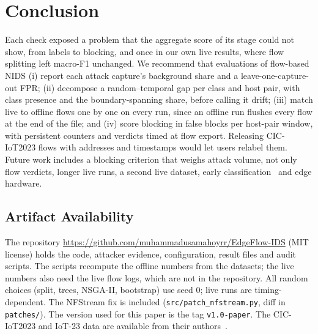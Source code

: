 \section{Conclusion}\label{sec:conclusion}

Each check exposed a problem that the aggregate score of its stage could not show, from labels to blocking, and once in our own live results, where flow splitting left macro-F1 unchanged. We recommend that evaluations of flow-based NIDS (i) report each attack capture's background share and a leave-one-capture-out FPR; (ii) decompose a random--temporal gap per class and host pair, with class presence and the boundary-spanning share, before calling it drift; (iii) match live to offline flows one by one on every run, since an offline run flushes every flow at the end of the file; and (iv) score blocking in false blocks per host-pair window, with persistent counters and verdicts timed at flow export. Releasing CIC-IoT2023 flows with addresses and timestamps would let users relabel them. Future work includes a blocking criterion that weighs attack volume, not only flow verdicts, longer live runs, a second live dataset, early classification~\cite{pekar2025early} and edge hardware.

\subsection{Artifact Availability}

The repository \url{https://github.com/muhammadusamahoyrr/EdgeFlow-IDS} (MIT license) holds the code, attacker evidence, configuration, result files and audit scripts. The scripts recompute the offline numbers from the datasets; the live numbers also need the live flow logs, which are not in the repository. All random choices (split, trees, NSGA-II, bootstrap) use seed 0; live runs are timing-dependent. The NFStream fix is included (\nolinkurl{src/patch_nfstream.py}, diff in \nolinkurl{patches/}). The version used for this paper is the tag \texttt{v1.0-paper}.
The CIC-IoT2023 and IoT-23 data are available from their authors~\cite{neto2023ciciot2023,garcia2020iot23}.
